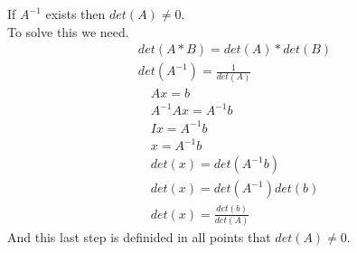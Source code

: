 \documentclass{article}
\begin{document}
    	If $A^{-1}$ exists then $det(A) \neq 0$.\\
    	To solve this we need.\\
    	\begin{align*}
    		det(A*B) = det(A)*det(B)\\
    		det(A^{-1})=\frac{1}{det(A)}
    	\end{align*}
       	\begin{align*}
       	Ax=b\\
       	A^{-1}Ax=A^{-1}b\\
		Ix=A^{-1}b\\
		x=A^{-1}b\\
		det(x)=det(A^{-1}b)\\
		det(x)=det(A^{-1})det(b)\\
		det(x)=\frac{det(b)}{det(A)}
		\end{align*}
		And this last step is definided in all points that $det(A) \neq 0$.
    
\end{document}
